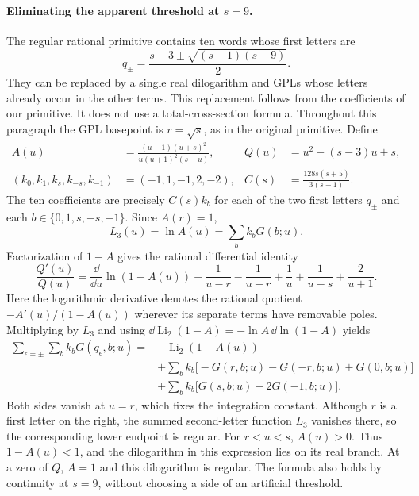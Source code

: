 \paragraph{Eliminating the apparent threshold at $s=9$.}
The regular rational primitive contains ten words whose first letters are
\begin{equation}
 q_\pm=\frac{s-3\pm\sqrt{(s-1)(s-9)}}2.
\end{equation}
They can be replaced by a single real dilogarithm and GPLs whose letters
already occur in the other terms. This replacement follows from the
coefficients of our primitive. It does not use a total-cross-section formula.
Throughout this paragraph the GPL basepoint is $r=\sqrt{s}$, as in the
original primitive. Define
\begin{align}
 A(u)&=\frac{(u-1)(u+s)^2}{u(u+1)^2(s-u)},
 &Q(u)&=u^2-(s-3)u+s,\\
 (k_0,k_1,k_s,k_{-s},k_{-1})&=(-1,1,-1,2,-2),
 &C(s)&=\frac{128s(s+5)}{3(s-1)}.
\end{align}
The ten coefficients are precisely $C(s)k_b$ for each of the two first
letters $q_\pm$ and each $b\in\{0,1,s,-s,-1\}$. Since $A(r)=1$,
\begin{equation}
 L_3(u)=\ln A(u)=\sum_b k_bG(b;u).
\end{equation}
Factorization of $1-A$ gives the rational differential identity
\begin{equation}
 \frac{Q'(u)}{Q(u)}
 =\frac{\dd}{\dd u}\ln(1-A(u))
 -\frac1{u-r}-\frac1{u+r}
 +\frac1u+\frac1{u-s}+\frac2{u+1}.
\end{equation}
Here the logarithmic derivative denotes the rational quotient
$-A'(u)/(1-A(u))$ wherever its separate terms have removable poles.
Multiplying by $L_3$ and using
$\dd\operatorname{Li}_2(1-A)=-\ln A\,\dd\ln(1-A)$ yields
\begin{align}
 \sum_{\epsilon=\pm}\sum_b k_bG(q_\epsilon,b;u)
 ={}&-\operatorname{Li}_2(1-A(u))\\
 &+\sum_b k_b\bigl[-G(r,b;u)-G(-r,b;u)
       +G(0,b;u)\bigr]\\
 &+\sum_b k_b\bigl[G(s,b;u)+2G(-1,b;u)\bigr].
 \label{eq:comp-real-qpair-reduction}
\end{align}
Both sides vanish at $u=r$, which fixes the integration constant.
Although $r$ is a first letter on the right, the summed second-letter
function $L_3$ vanishes there, so the corresponding lower endpoint is
regular. For $r<u<s$, $A(u)>0$. Thus $1-A(u)<1$, and the dilogarithm
in this expression lies on its real branch. At a zero of $Q$, $A=1$
and this dilogarithm is regular. The formula also holds by continuity
at $s=9$, without choosing a side of an artificial threshold.


